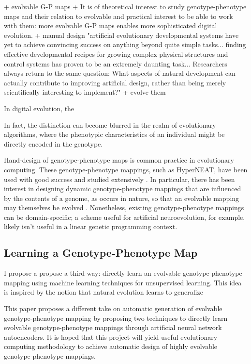 + evolvable G-P maps
  + It is of theoretical interest to study genotype-phenotype maps and their relation to evolvable and practical interest to be able to work with them: more evolvable G-P maps enables more sophisticated digital evolution.
  + manual design \cite[p 223]{downing2015intelligence}
  "artificial evolutionary developmental systems have yet to achieve convincing success on anything beyond quite simple tasks... finding effective developmental recipes for growing complex physical structures and control systems has proven to be an extremely daunting task... Researchers always return to the same question: What aspects of natural development can actually contribute to improving artificial design, rather than being merely scientifically interesting to implement?"
  + evolve them \cite{reisinger2007acquiring}


  In digital evolution, the

  In fact, the distinction can become blurred in the realm of evolutionary algorithms, where the phenotypic characteristics of an individual might be directly encoded in the genotype.


  Hand-design of genotype-phenotype maps is common practice in evolutionary computing.
  These genotype-phenotype mappings, such as HyperNEAT, have been used with good success and studied extensively \cite{stanley2009hypercube, woolley2010evolving, clune2011performance}.
  In particular, there has been interest in designing dynamic genotype-phenotype mappings that are influenced by the contents of a genome, as occurs in nature, so that an evolvable mapping may themselves be evolved \cite{reisinger2007acquiring}.
  Nonetheless, existing genotype-phenotype mappings can be domain-specific;
  a scheme useful for artificial neuroevolution, for example, likely isn't useful in a linear genetic programming context.


\subsection{Learning a Genotype-Phenotype Map}

I propose a propose a third way: directly learn an evolvable genotype-phenotype mapping using machine learning techniques for unsupervised learning.
This idea is inspired by the notion that natural evolution learns to generalize \cite{kouvaris2017evolution} \cite{watson2016can}

This paper proposes a different take on automatic generation of evolvable genotype-phenotype mapping by proposing two techniques to directly learn evolvable genotype-phenotype mappings through artificial neural network autoencoders.
It is hoped that this project will yield useful evolutionary computing methodology to achieve automatic design of highly evolvable genotype-phenotype mappings.



